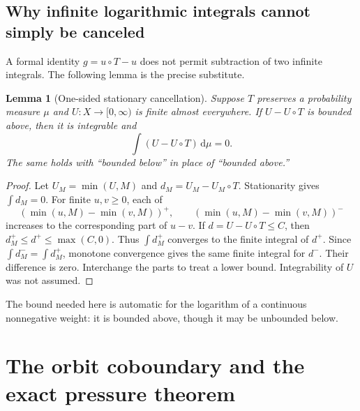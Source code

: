 \documentclass[11pt,a4paper]{article}
\numberwithin{equation}{section}
\newtheorem{lemma}[lemma]{Lemma}\aliascntresetthe{lemma}
\theoremstyle{definition}
\theoremstyle{remark}
\newcommand{\dd}{\,\mathrm d}
\begin{document}
\subsection{Why infinite logarithmic integrals cannot simply be canceled}
A formal identity $g=u\circ T-u$ does not permit subtraction of two
infinite integrals. The following lemma is the precise substitute.
\begin{lemma}[One-sided stationary cancellation]
\label{lem:cancellation}
Suppose $T$ preserves a probability measure $\mu$ and
$U\colon X\to[0,\infty)$ is finite almost everywhere. If
$U-U\circ T$ is bounded above, then it is integrable and
\begin{equation}
 \int(U-U\circ T)\dd\mu=0.
 \label{eq:cancellation}
\end{equation}
The same holds with ``bounded below'' in place of ``bounded above.''
\end{lemma}
\begin{proof}
Let $U_M=\min(U,M)$ and $d_M=U_M-U_M\circ T$.
Stationarity gives $\int d_M=0$. For finite $u,v\ge0$, each of
\[
 (\min(u,M)-\min(v,M))^+,
 \qquad(\min(u,M)-\min(v,M))^-
\]
increases to the corresponding part of $u-v$.
If $d=U-U\circ T\le C$, then $d_M^+\le d^+\le\max(C,0)$.
Thus $\int d_M^+$ converges to the finite integral of $d^+$.
Since $\int d_M^- =\int d_M^+$, monotone convergence gives the same
finite integral for $d^-$. Their difference is zero. Interchange the
parts to treat a lower bound. Integrability of $U$ was not assumed.
\end{proof}
The bound needed here is automatic for the logarithm of a continuous
nonnegative weight: it is bounded above, though it may be unbounded below.

\section{The orbit coboundary and the exact pressure theorem}
\label{sec:proof-pressure}
\end{document}
